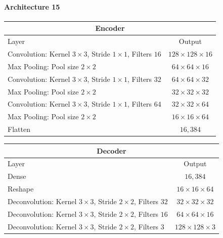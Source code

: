 \paragraph{Architecture 15}

\begin{center}
    \begin{table}[H]
        \centering
        \begin{tabular}{ | l | c | }
            \multicolumn{2}{c}{Encoder} \\ \hline
            Layer & Output\\ \hline
            Convolution: Kernel $3\times3$, Stride $1\times1$, Filters $16 $    & $128\times 128\times 16  $    \\
            Max Pooling: Pool size $2\times2$                                   & $64\times 64\times   16  $    \\  
            Convolution: Kernel $3\times3$, Stride $1\times1$, Filters $32 $    & $64\times 64\times   32 $    \\
            Max Pooling: Pool size $2\times2$                                   & $32\times 32\times   32 $    \\
            Convolution: Kernel $3\times3$, Stride $1\times1$, Filters $64 $    & $32\times 32\times   64 $    \\
            Max Pooling: Pool size $2\times2$                                   & $16\times 16\times   64 $    \\
            Flatten                                                             & $16,384$                      \\
            \hline
        \end{tabular} 
    \end{table}
\end{center}
\vspace{-4em}
\begin{center}
    \begin{table}[H]
        \centering
        \begin{tabular}{ | l | c | }
            \multicolumn{2}{c}{Decoder} \\ \hline
            Layer & Output\\ \hline
            Dense                                                                   & $16,384$                   \\
            Reshape                                                                 & $16\times 16\times  64 $  \\
            Deconvolution: Kernel $3\times3$, Stride $2\times2$, Filters $32 $      & $32\times 32\times  32 $  \\
            Deconvolution: Kernel $3\times3$, Stride $2\times2$, Filters $16 $      & $64\times 64\times  16 $  \\
            Deconvolution: Kernel $3\times3$, Stride $2\times2$, Filters $3  $      & $128\times 128\times3  $  \\
            \hline
        \end{tabular}
    \end{table}
\end{center}

